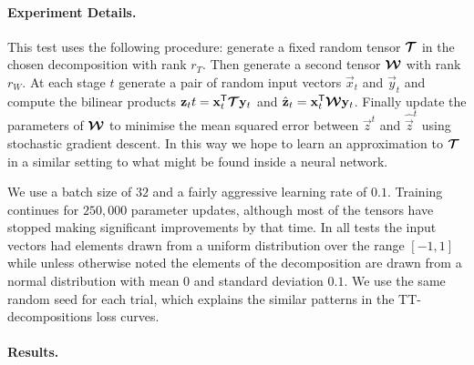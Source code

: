 \paragraph{Experiment Details.}
This test uses the following procedure: generate a fixed random tensor \(\bm{\mathcal{T}}\)
in the chosen decomposition with rank \(r_T\). Then generate a second tensor \(\bm{\mathcal{W}}\) 
with rank \(r_W\). At each stage \(t\) generate a pair of random input vectors \(\vec{x}_t\) and
\(\vec{y}_t\) and compute the bilinear products 
\(\mathbf{z}_tt = \mathbf{x}_t^\mathsf{T}\bm{\mathcal{T}}\mathbf{y}_t\) and 
\(\hat{\mathbf{z}}_t = \mathbf{x}_t^\mathsf{T}\bm{\mathcal{W}}\mathbf{y}_t\). Finally update the parameters of
\(\bm{\mathcal{W}}\) to minimise the mean squared error between \(\vec{z}^t\) and \(\hat{\vec{z}}^t\)
using stochastic gradient descent. In this way we hope to learn an approximation to 
\(\bm{\mathcal{T}}\) in a similar setting to what might be found inside a neural network.

We use a batch size of \(32\) and a fairly aggressive
 learning rate of \(0.1\).
Training continues for \(250,000\) parameter updates, although most of the tensors have stopped
making significant improvements by that time. In all tests the input vectors had elements drawn
from a uniform distribution over the range \([-1,1]\) while unless otherwise noted the elements of
the decomposition are drawn from a normal distribution with mean \(0\) and standard deviation
\(0.1\). We use the same random seed for each trial, which explains the similar patterns in the
TT-decompositions loss curves.

\paragraph{Results.}

